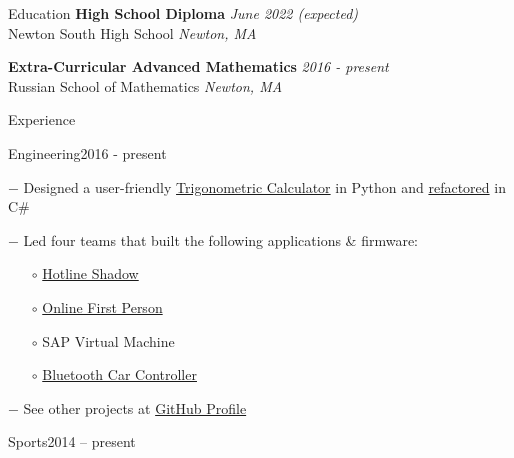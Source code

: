 \documentclass{resume} %
\begin{document}
\large

\begin{rSection}{\LARGE Education}
{\bf High School Diploma} \hfill {\em June 2022 (expected)} 
\\ Newton South High School \hfill \textit{Newton, MA}

{\bf Extra-Curricular Advanced Mathematics} \hfill {\em 2016 - present} 
\\ Russian School of Mathematics \hfill \textit{Newton, MA}


\end{rSection}


\begin{rSection}{\LARGE Experience}

\begin{rSubsection}{\LARGE Engineering}{2016 - present}
{\tiny }{\tiny }




\item[$-$] Designed a user-friendly \href{https://github.com/amylnikov30/AdvancedTrigCalc}{Trigonometric Calculator} in Python and \href{https://github.com/amylnikov30/TrigCalcv2.x}{refactored} in C\#


\item[$-$] Led four teams that built the following applications \& firmware: 
\begin{itemize}
    \item[$\circ$] \href{https://github.com/amylnikov30/GameWithMultiplayer}{Hotline Shadow}
    \item[$\circ$] \href{https://github.com/NSHSProgrammingClub/cargameserver}{Online First Person}
    \item[$\circ$] SAP Virtual Machine
    \item[$\circ$] \href{https://github.com/amylnikov30/BluetoothCarController}{Bluetooth Car Controller}
\end{itemize}


\item[$-$]  See other projects at {\href{https://github.com/amylnikov30}{GitHub Profile}}




\end{rSubsection}


\begin{rSubsection}{\LARGE Sports}{2014 -- present}
{}{}


\end{rSubsection}
\end{rSection}
\end{document}
